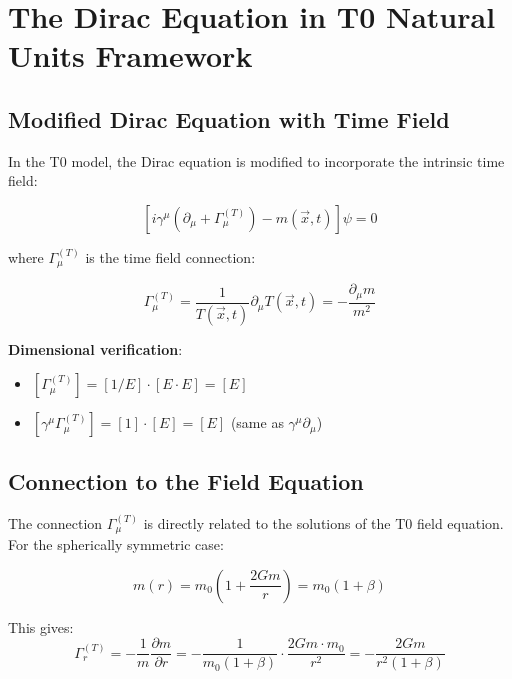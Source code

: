 \documentclass[12pt,a4paper]{article}
\newcommand{\Tfieldt}{T(\vec{x},t)}
\begin{document}
	\section{The Dirac Equation in T0 Natural Units Framework}
	\label{sec:dirac_t0_framework}
	
	\subsection{Modified Dirac Equation with Time Field}
	\label{subsec:modified_dirac}
	
	In the T0 model, the Dirac equation is modified to incorporate the intrinsic time field:
	
	\begin{equation}
		\boxed{[i\gamma^{\mu}(\partial_{\mu} + \Gamma_{\mu}^{(T)}) - m(\vec{x},t)]\psi = 0}
		\label{eq:t0_dirac_equation}
	\end{equation}
	
	where $\Gamma_{\mu}^{(T)}$ is the time field connection:
	
	\begin{equation}
		\Gamma_{\mu}^{(T)} = \frac{1}{\Tfieldt} \partial_{\mu} \Tfieldt = -\frac{\partial_{\mu} m}{m^2}
		\label{eq:time_field_connection}
	\end{equation}
	
	\textbf{Dimensional verification}:
	\begin{itemize}
		\item $[\Gamma_{\mu}^{(T)}] = [1/E] \cdot [E \cdot E] = [E]$
		\item $[\gamma^{\mu} \Gamma_{\mu}^{(T)}] = [1] \cdot [E] = [E]$ (same as $\gamma^{\mu} \partial_{\mu}$) \checkmark
	\end{itemize}
	
	\subsection{Connection to the Field Equation}
	\label{subsec:field_connection}
	
	The connection $\Gamma_{\mu}^{(T)}$ is directly related to the solutions of the T0 field equation. For the spherically symmetric case:
	
	\begin{equation}
		m(r) = m_0\left(1 + \frac{2Gm}{r}\right) = m_0(1 + \beta)
		\label{eq:mass_field_solution}
	\end{equation}
	
	This gives:
	\begin{equation}
		\Gamma_{r}^{(T)} = -\frac{1}{m} \frac{\partial m}{\partial r} = -\frac{1}{m_0(1+\beta)} \cdot \frac{2Gm \cdot m_0}{r^2} = -\frac{2Gm}{r^2(1+\beta)}
		\label{eq:radial_connection}
	\end{equation}
	
\end{document}
